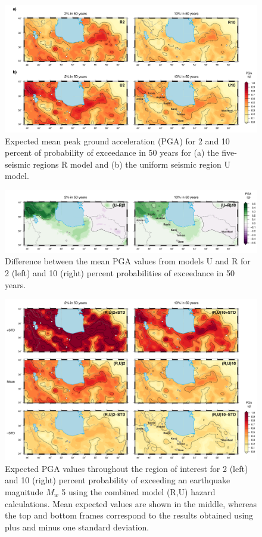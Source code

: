 \begin{figure}[t]
    \centering
    \includegraphics[width=\textwidth]{figures/pdf/figure-08.pdf} 
    \caption{Expected mean peak ground acceleration (PGA) for 2 and 10 percent of probability of exceedance in 50 years for (a) the five-seismic regions R model and (b) the uniform seismic region U model.}
    \label{fig:pga}
\end{figure}

\begin{figure}[t]
    \centering
    \includegraphics[width=\textwidth]{figures/pdf/figure-09.pdf} 
    \caption{Difference between the mean PGA values from models U and R for 2 (left) and 10 (right) percent probabilities of exceedance in 50 years.}
    \label{fig:pga.diff}
\end{figure}

\begin{figure}[t]
    \centering
    \includegraphics[width=\textwidth]{figures/pdf/figure-10.pdf} 
    \caption{Expected PGA values throughout the region of interest for 2 (left) and 10 (right) percent probability of exceeding an earthquake magnitude $M_w$ 5 using the combined model (R,U) hazard calculations. Mean expected values are shown in the middle, whereas the top and bottom frames correspond to the results obtained using plus and minus one standard deviation.}
    \label{fig:pga.ru.std}
\end{figure}

